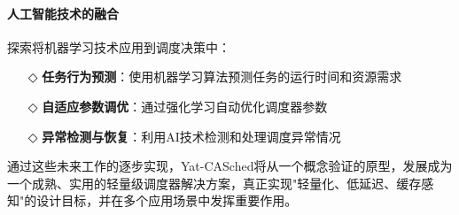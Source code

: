 \paragraph{人工智能技术的融合}

探索将机器学习技术应用到调度决策中：

\begin{itemize}
    \item[◇] \textbf{任务行为预测}：使用机器学习算法预测任务的运行时间和资源需求
    \item[◇] \textbf{自适应参数调优}：通过强化学习自动优化调度器参数
    \item[◇] \textbf{异常检测与恢复}：利用AI技术检测和处理调度异常情况
\end{itemize}

通过这些未来工作的逐步实现，Yat-CASched将从一个概念验证的原型，发展成为一个成熟、实用的轻量级调度器解决方案，真正实现"轻量化、低延迟、缓存感知"的设计目标，并在多个应用场景中发挥重要作用。
